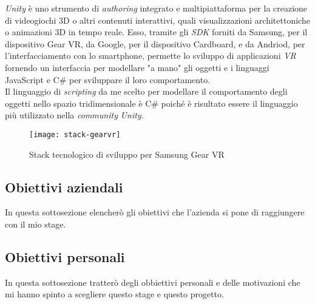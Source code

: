 \textit{Unity} è uno strumento di \textit{authoring} integrato e multipiattaforma per la creazione di videogiochi 3D o altri contenuti interattivi, quali visualizzazioni architettoniche o animazioni 3D in tempo reale. Esso, tramite gli \textit{SDK} forniti da Samsung, per il dispositivo Gear VR, da Google, per il dispositivo Cardboard, e da Andriod, per l'interfacciamento con lo smartphone, permette lo sviluppo di applicazioni \textit{VR} fornendo un interfaccia per modellare "a mano" gli oggetti e i linguaggi JavaScript e C\# per sviluppare il loro comportamento. \\
Il linguaggio di \textit{scripting} da me scelto per modellare il comportamento degli oggetti nello spazio tridimensionale è C\# poiché è risultato essere il linguaggio più utilizzato nella \textit{community} \textit{Unity}.

\label{Gear VR}
\begin{figure}[ht]
	\begin{center}
		\texttt{[image: stack-gearvr]}
		\caption{Stack tecnologico di sviluppo per Samsung Gear VR}
	\end{center}
\end{figure}
\FloatBarrier

\subsection{Obiettivi aziendali}

In questa sottosezione elencherò gli obiettivi che l'azienda si pone di raggiungere con il mio stage.

\subsection{Obiettivi personali}

In questa sottosezione tratterò degli obbiettivi personali e delle motivazioni che mi hanno spinto a scegliere questo stage e questo progetto.



